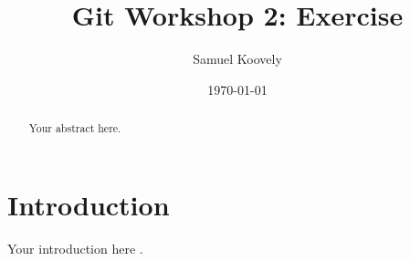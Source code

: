 \documentclass{article}
\title{Git Workshop 2: Exercise}
\author{Samuel Koovely}
\date{\today}
\begin{document}
\maketitle

\begin{abstract}
Your abstract here.
\end{abstract}

\section{Introduction}
Your introduction here \cite{example}.



\end{document}
